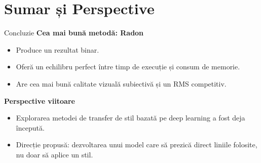 \documentclass[aspectratio=169,xcolor=dvipsnames]{beamer}
\begin{document}
\section{Sumar și Perspective}
\begin{frame}{Concluzie}
    \textbf{Cea mai bună metodă: Radon}
    \begin{itemize}
        \item Produce un rezultat binar.
        \item Oferă un echilibru perfect între timp de execuție și consum de memorie.
        \item Are cea mai bună calitate vizuală subiectivă și un RMS competitiv.
    \end{itemize}

    \vspace{0.5cm}

    \textbf{Perspective viitoare}
    \begin{itemize}
        \item Explorarea metodei de transfer de stil bazată pe deep learning a fost deja începută.
        \item Direcție propusă: dezvoltarea unui model care să prezică direct liniile folosite, nu doar să aplice un stil.
    \end{itemize}
\end{frame}
\end{document}
